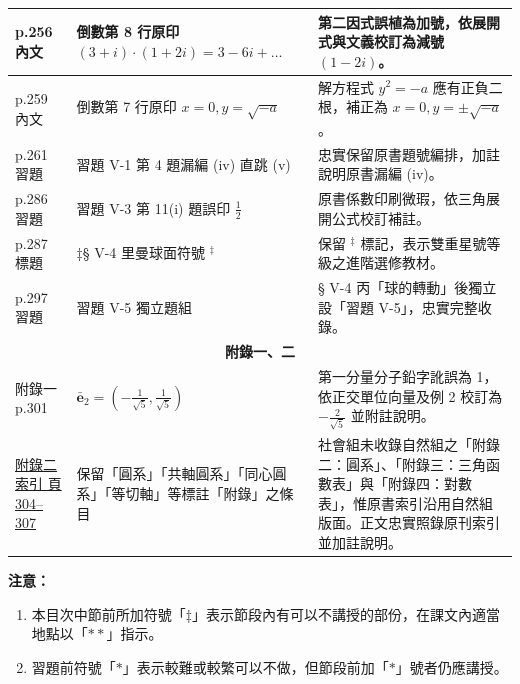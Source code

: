 \documentclass[a4paper,12pt,twoside]{article}
\begin{document}
\begin{table}[H]
\begin{tabularx}{\textwidth}{|p{3.0cm}|p{3.8cm}|X|}
p.256 內文 & 倒數第 8 行原印 $(3+i)\cdot(1+2i) = 3-6i+\dots$ & 第二因式誤植為加號，依展開式與文義校訂為減號 $(1-2i)$。 \\ \hline
p.259 內文 & 倒數第 7 行原印 $x=0, y=\sqrt{-a}$ & 解方程式 $y^2 = -a$ 應有正負二根，補正為 $x=0, y=\pm\sqrt{-a}$。 \\ \hline
p.261 習題 & 習題 V-1 第 4 題漏編 (iv) 直跳 (v) & 忠實保留原書題號編排，加註說明原書漏編 (iv)。 \\ \hline
p.286 習題 & 習題 V-3 第 11(i) 題誤印 $\frac{1}{2}$ & 原書係數印刷微瑕，依三角展開公式校訂補註。 \\ \hline
p.287 標題 & ‡§ V-4 里曼球面符號 ${}^\ddagger$ & 保留 ${}^\ddagger$ 標記，表示雙重星號等級之進階選修教材。 \\ \hline
p.297 習題 & 習題 V-5 獨立題組 & § V-4 丙「球的轉動」後獨立設「習題 V-5」，忠實完整收錄。 \\ \hline

\multicolumn{3}{|c|}{\textbf{附錄一、二}} \\ \hline

附錄一 p.301 & $\bar{\mathbf{e}}_2 = (-\frac{1}{\sqrt{5}}, \frac{1}{\sqrt{5}})$ & 第一分量分子鉛字訛誤為 1，依正交單位向量及例 2 校訂為 $-\frac{2}{\sqrt{5}}$ 並附註說明。 \\ \hline
\hyperref[note:b4s-a2-plate]{附錄二 索引 頁 304--307} & 保留「圓系」「共軸圓系」「同心圓系」「等切軸」等標註「附錄」之條目 & 社會組未收錄自然組之「附錄二：圓系」、「附錄三：三角函數表」與「附錄四：對數表」，惟原書索引沿用自然組版面。正文忠實照錄原刊索引並加註說明。 \\ \hline

\end{tabularx}
\end{table}

\clearpage


\clearpage
\tableofcontents

\vspace{1em}
\noindent\textbf{注\quad 意：}
\begin{enumerate}
  \item 本目次中節前所加符號「$\ddagger$」表示節段內有可以不講授的部份，在課文內適當地點以「$**$」指示。
  \item 習題前符號「$*$」表示較難或較繁可以不做，但節段前加「$*$」號者仍應講授。
\end{enumerate}
\newpage

\end{document}
